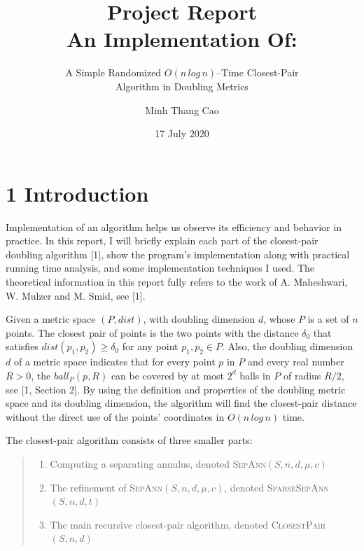 \documentclass[12pt,english,]{article}
\title{\textbf{Project Report}\\
\Large{An Implementation Of:}}
\subtitle{A Simple Randomized \(O(n\,log\, n)\)--Time Closest-Pair\\
Algorithm in Doubling Metrics}
\author{Minh Thang Cao}
\date{17 July 2020}
\begin{document}
\maketitle

\hypertarget{section1}{%
\section{\texorpdfstring{1
\enspace Introduction}{1 Introduction}}\label{section1}}

Implementation of an algorithm helps us observe its efficiency and
behavior in practice. In this report, I will briefly explain each part
of the closest-pair doubling algorithm {[}1{]}, show the program's
implementation along with practical running time analysis, and some
implementation techniques I used. The theoretical information in this
report fully refers to the work of A. Maheshwari, W. Mulzer and M. Smid,
see {[}1{]}.

Given a metric space \((P,dist)\), with doubling dimension \(d\), whose
\(P\) is a set of \(n\) points. The closest pair of points is the two
points with the distance \(\delta_0\) that satisfies
\(dist(p_1, p_2) \geq \delta_0\) for any point \(p_1, p_2 \in P\). Also,
the doubling dimension \(d\) of a metric space indicates that for every
point \(p\) in \(P\) and every real number \(R > 0\), the
\(ball_P(p, R)\) can be covered by at most \(2^d\) balls in \(P\) of
radius \(R/2\), see {[}1, Section 2{]}. By using the definition and
properties of the doubling metric space and its doubling dimension, the
algorithm will find the closest-pair distance without the direct use of
the points' coordinates in \(O(n\,log\,n)\) time.

The closest-pair algorithm consists of three smaller parts:

\vspace{-2.5truemm}

\begin{quote}
\begin{enumerate}
\item Computing a separating annulus, denoted \textsc{SepAnn}$(S,n,d,\mu,c)$
\item The refinement of \textsc{SepAnn}$(S,n,d,\mu,c)$, denoted \textsc{SparseSepAnn}$(S,n,d,t)$
\item The main recursive closest-pair algorithm, denoted \textsc{ClosestPair}$(S,n,d)$
\end{enumerate}
\end{quote}
\end{document}
